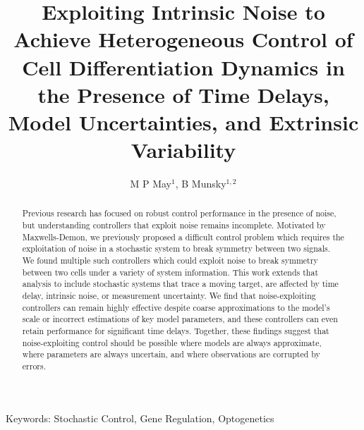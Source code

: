 \documentclass[12pt]{iopart}
\begin{document}
\def\brian[#1]{{\color{red} #1 }}

\title[Heterogeneous Control of Cell Differentiation Dynamics]{Exploiting Intrinsic Noise to Achieve Heterogeneous Control of Cell Differentiation Dynamics in the Presence of Time Delays, Model Uncertainties, and Extrinsic Variability}
\maketitle

\author{M P May$^1$, B Munsky$^{1,2}$}

\address{$^1$ School of Bioengineering, Colorado State University, Fort Collins, CO, USA}
\address{$^2$ Department of Chemical and Biological Engineering, Colorado State University, Fort Collins, CO, USA}

\begin{abstract}
Previous research has focused on robust control performance in the presence of noise, but understanding controllers that exploit noise remains incomplete. 
Motivated by Maxwells-Demon, we previously proposed a difficult control problem which requires the exploitation of noise in a stochastic system to break symmetry between two signals. We found multiple such controllers which could exploit noise to break symmetry between two cells under a variety of system information.
This work extends that analysis to include stochastic systems that trace a moving target, are affected by time delay, intrinsic noise, or measurement uncertainty.
 We find that noise-exploiting controllers can remain highly effective despite coarse approximations to the model's scale or incorrect estimations of key model parameters, and these controllers can even retain performance for significant time delays.  Together, these findings suggest that noise-exploiting control should be possible where models are always approximate, where parameters are always uncertain, and where observations are corrupted by errors.


\end{abstract}
Keywords: Stochastic Control, Gene Regulation, Optogenetics

%
%
%
\maketitle
% 
\end{document}
